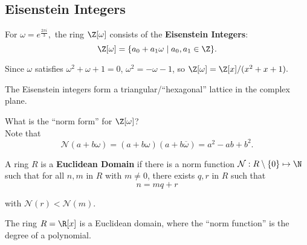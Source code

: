 \documentclass[11pt]{article}
\begin{document}
\subsection{Eisenstein Integers}

\begin{definition}
For $\omega = e^{\frac{2\pi i}{3}},$ the ring $\Z[\omega]$ consists of the \textbf{Eisenstein Integers}:
\[
    \Z[\omega] = \{ a_0 + a_1 \omega \mid a_0, a_1 \in \Z \}.
\] 

Since $\omega$ satisfies $\omega^2 + \omega + 1 = 0$, $\omega^2 = -\omega - 1$, so $\Z[\omega] = \Z[x] / (x^2 + x + 1).$
\end{definition}

\begin{remark}
The Eisenstein integers form a triangular/``hexagonal'' lattice in the complex plane.
\end{remark}

\begin{exercise}
What is the ``norm form'' for $\Z[\omega]$? \\

Note that 
\[
    \mathcal{N}(a + b\omega) = (a+b\omega)(a+b \overline{\omega}) = a^2 - ab + b^2.
\]
\end{exercise}

\begin{definition}
A ring $R$ is a \textbf{Euclidean Domain} if there is a norm function $\mathcal{N}: R \setminus \{ 0 \} \mapsto \N$
such that for all $n, m$ in $R$ with $m \neq 0$, there exists $q, r$ in $R$ such that
\[
    n = mq + r
\]

with $\mathcal{N}(r) < \mathcal{N}(m).$
\end{definition}

\begin{remark}
The ring $R = \R[x]$ is a Euclidean domain, where the ``norm function'' is the degree of a polynomial.
\end{remark}
\end{document}

